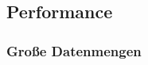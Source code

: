 \subsection{Performance}
\label{ssec:ea-performance}

\subsubsection{Große Datenmengen}
\label{sssec:eap-grosse-datenmengen}
